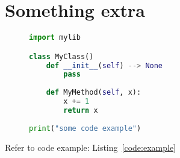 \documentclass[1-ambra-tesi.tex]{subfiles}
\begin{document}
\begin{appendices}
\label{appendix}


\chapter{Something extra}
\label{app:extra}
\lipsum[1]

\begin{figure}[ht]
\centering
\begin{lstlisting}[language=Python, label={code:example}, caption={Fancy code.}]
import mylib

class MyClass()
    def __init__(self) --> None
        pass
        
    def MyMethod(self, x):
        x += 1
        return x 
        
print("some code example")
\end{lstlisting}
\end{figure}

\lipsum[2]

Refer to code example: Listing~\ref{code:example}


\end{appendices}
\end{document}
